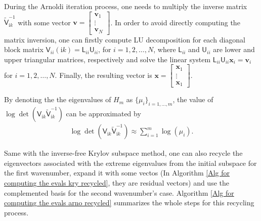 \begin{remark}
    During the Arnoldi iteration process, one needs to multiply the inverse matrix $\tilde{\mathsf{V}}_{\mathrm{i}k}^{-1}$ with some vector 
$\boldsymbol{v} = \begin{bmatrix}\boldsymbol{v}_{1}\\ \vdots \\ \boldsymbol{v}_{N} \end{bmatrix}$. In order to avoid directly computing 
the matrix inversion, one can firstly compute LU decomposition for each diagonal 
block matrix $\mathsf{V}_{ii}(\mathrm{i}k) = \mathsf{L}_{ii}\mathsf{U}_{ii} $, for $i = 1, 2, \dots, N$, where $\mathsf{L}_{ii}$ and $\mathsf{U}_{ii}$ are lower and upper triangular matrices, 
respectively and solve the linear system $\mathsf{L}_{ii}\mathsf{U}_{ii}\boldsymbol{x}_{i} = \boldsymbol{v}_{i}$ for $i = 1, 2, \dots, N$. Finally, the resulting 
vector is $\boldsymbol{x} = \begin{bmatrix}\boldsymbol{x}_{1}\\ \vdots \\ \boldsymbol{x}_{1} \end{bmatrix}$.
\end{remark}


By denoting the the eigenvalues of $H_{m}$ as $\{\mu_{i}\}_{i = 1, \dots, m}$, the value of  
$\log\det(\mathsf{V}_{\mathrm{i}k}\tilde{\mathsf{V}}_{\mathrm{i}k}^{-1})$ can be approximated by
\begin{align*}
    \log\det(\mathsf{V}_{\mathrm{i}k}\tilde{\mathsf{V}}_{\mathrm{i}k}^{-1}) \approx \sum_{i = 1}^{m}\log\left(\mu_{i}\right).
\end{align*}

Same with the inverse-free Krylov subspace method, one can also recycle the eigenvectors associated with the extreme eigenvalues from the initial subspace 
for the first wavenumber, expand it with some vectos (In Algorithm \ref{Alg for computing the evals kry recycled}, they are residual vectors) and 
use the complemented basis for the second wavenumber's case. Algorithm \ref{Alg for computing the evals arno recycled} summarizes the whole steps for this 
recycling process. 

